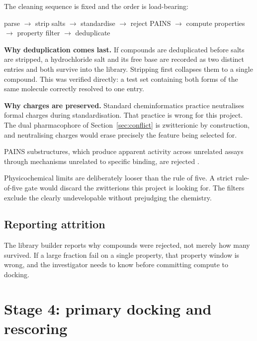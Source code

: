 \documentclass[11pt,a4paper]{article}
\begin{document}
The cleaning sequence is fixed and the order is load-bearing:

\begin{center}
parse $\rightarrow$ strip salts $\rightarrow$ standardise $\rightarrow$ reject
PAINS $\rightarrow$ compute properties $\rightarrow$ property filter
$\rightarrow$ deduplicate
\end{center}

\begin{keybox}
\textbf{Why deduplication comes last.} If compounds are deduplicated before
salts are stripped, a hydrochloride salt and its free base are recorded as two
distinct entries and both survive into the library. Stripping first collapses
them to a single compound. This was verified directly: a test set containing
both forms of the same molecule correctly resolved to one entry.
\end{keybox}

\begin{keybox}
\textbf{Why charges are preserved.} Standard cheminformatics practice
neutralises formal charges during standardisation. That practice is wrong for
this project. The dual pharmacophore of Section~\ref{sec:conflict} is
zwitterionic by construction, and neutralising charges would erase precisely the
feature being selected for.
\end{keybox}

PAINS substructures, which produce apparent activity across unrelated assays
through mechanisms unrelated to specific binding, are rejected
\cite{baell2010}.

Physicochemical limits are deliberately looser than the rule of five. A strict
rule-of-five gate would discard the zwitterions this project is looking for.
The filters exclude the clearly undevelopable without prejudging the chemistry.

\subsection{Reporting attrition}

The library builder reports why compounds were rejected, not merely how many
survived. If a large fraction fail on a single property, that property window is
wrong, and the investigator needs to know before committing compute to docking.

\section{Stage 4: primary docking and rescoring}
\end{document}
